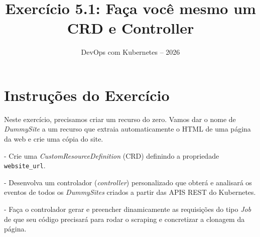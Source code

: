 \documentclass[11pt,a4paper]{article}
\title{\color{secondary}\Huge\textbf{Exercício 5.1: Faça você mesmo um CRD e Controller}}
\author{\color{primary}DevOps com Kubernetes -- 2026}
\date{}
\begin{document}
\maketitle

\section*{\color{primary}Instruções do Exercício}
\begin{tcolorbox}[colback=blue!5!white,colframe=blue!75!black,title=Exercício 5.1: Faça você mesmo um CRD e Controller]
Neste exercício, precisamos criar um recurso do zero. Vamos dar o nome de \textit{DummySite} a um recurso que extraia automaticamente o HTML de uma página da web e crie uma cópia do site.

- Crie uma \textit{CustomResourceDefinition} (CRD) definindo a propriedade \texttt{website\_url}.

- Desenvolva um controlador (\textit{controller}) personalizado que obterá e analisará os eventos de todos os \textit{DummySites} criados a partir das APIS REST do Kubernetes.

- Faça o controlador gerar e preencher dinamicamente as requisições do tipo \textit{Job} de que seu código precisará para rodar o scraping e concretizar a clonagem da página.
\end{tcolorbox}
\end{document}
